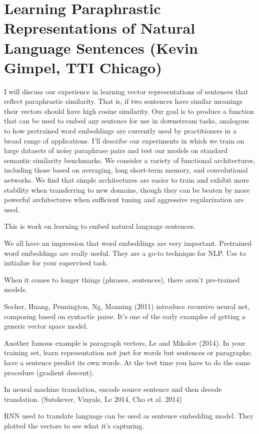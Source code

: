 \section{Learning Paraphrastic Representations of Natural Language Sentences (Kevin Gimpel, TTI Chicago)}

I will discuss our experience in learning vector representations of sentences that reflect paraphrastic similarity. That is, if two sentences have similar meanings their vectors should have high cosine similarity. Our goal is to produce a function that can be used to embed any sentence for use in downstream tasks, analogous to how pretrained word embeddings are currently used by practitioners in a broad range of applications. I'll describe our experiments in which we train on large datasets of noisy paraphrase pairs and test our models on standard semantic similarity benchmarks. We consider a variety of functional architectures, including those based on averaging, long short-term memory, and convolutional networks. We find that simple architectures are easier to train and exhibit more stability when transferring to new domains, though they can be beaten by more powerful architectures when sufficient tuning and aggressive regularization are used.

This is work on learning to embed natural language sentences.

We all have an impression that word embeddings are very important. Pretrained word embeddings are really useful. They are a go-to technique for NLP. Use to initialize for your supervised task.

When  it comes to longer things (phrases, sentences), there aren't pre-trained models. 

Socher, Huang, Pennington, Ng, Manning (2011) introduce recursive neural net, composing based on syntactic parse. It's one of the early examples of getting a generic vector space model. 

Another famous example is paragraph vectors, Le and Mikolov (2014). In your training set, learn representation not just for words but sentences or paragraphs; have a sentence predict its own words. At the test time you have to do the same procedure (gradient descent).

In neural machine translation, encode source sentence and then decode translation. (Sutskever, Vinyals, Le 2014, Cho et al. 2014)

RNN used to translate language can be used as sentence embedding model. They plotted the vectors to see what it's capturing.

